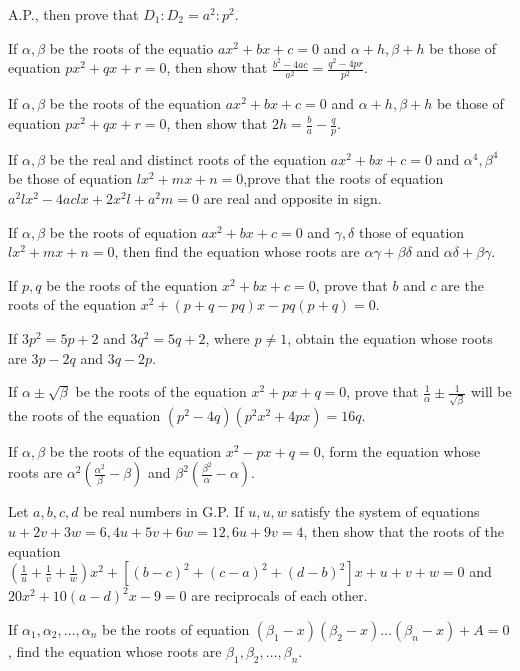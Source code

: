   A.P., then prove that $D_1:D_2 = a^2:p^2$.
\item If $\alpha, \beta$ be the roots of the equatio $ax^2 + bx + c = 0$ and $\alpha + h, \beta + h$ be those of equation $px^2 +
  qx + r = 0$, then show that $\frac{b^2 - 4ac}{a^2} = \frac{q^2 - 4pr}{p^2}$.
\item If $\alpha, \beta$ be the roots of the equation $ax^2 + bx + c =0$ and $\alpha + h, \beta + h$ be those of equation $px^2 +
  qx + r = 0$, then show that $2h = \frac{b}{a} - \frac{q}{p}$.
\item If $\alpha, \beta$ be the real and distinct roots of the equation $ax^2 + bx + c = 0$ and $\alpha^4, \beta^4$ be those of
  equation $lx^2 + mx + n = 0$,prove that the roots of equation $a^2lx^2 - 4aclx + 2x^2l + a^2m = 0$ are real and opposite in sign.
\item If $\alpha, \beta$ be the roots of equation $ax^2 + bx + c = 0$ and $\gamma, \delta$ those of equation $lx^2 + mx + n = 0$,
  then find the equation whose roots are $\alpha\gamma + \beta\delta$ and $\alpha\delta + \beta\gamma$.
\item If $p, q$ be the roots of the equation $x^2 + bx + c = 0$, prove that $b$ and $c$ are the roots of the equation $x^2 + (p + q
  - pq)x - pq(p + q) = 0$.
\item If $3p^2 = 5p + 2$ and $3q^2 = 5q + 2$, where $p\neq 1$, obtain the equation whose roots are $3p - 2q$ and $3q - 2p$.
\item If $\alpha\pm\sqrt{\beta}$ be the roots of the equation $x^2 + px + q = 0$, prove that $\frac{1}{\alpha}\pm
  \frac{1}{\sqrt{\beta}}$ will be the roots of the equation $(p^2 - 4q)(p^2x^2 + 4px) = 16q$.
\item If $\alpha, \beta$ be the roots of the equation $x^2 - px + q = 0$, form the equation whose roots are
  $\alpha^2\left(\frac{\alpha^2}{\beta} -\beta\right)$ and $\beta^2\left(\frac{\beta^2}{\alpha} - \alpha\right)$.
\item Let $a, b, c, d$ be real numbers in G.P. If $u, u, w$ satisfy the system of equations $u + 2v + 3w = 6, 4u + 5v + 6w = 12, 6u
  + 9v = 4$, then show that the roots of the equation $\left(\frac{1}{u} + \frac{1}{v} + \frac{1}{w}\right)x^2 +[(b - c)^2 + (c -
    a)^2 + (d - b)^2]x + u + v + w = 0$ and $20x^2 + 10(a - d)^2x - 9 = 0$ are reciprocals of each other.
\item If $\alpha_1, \alpha_2, \ldots, \alpha_n$ be the roots of equation $(\beta_1 - x)(\beta_2 - x)\ldots (\beta_n - x) + A = 0$,
  find the equation whose roots are $\beta_1, \beta_2, \ldots, \beta_n$.
